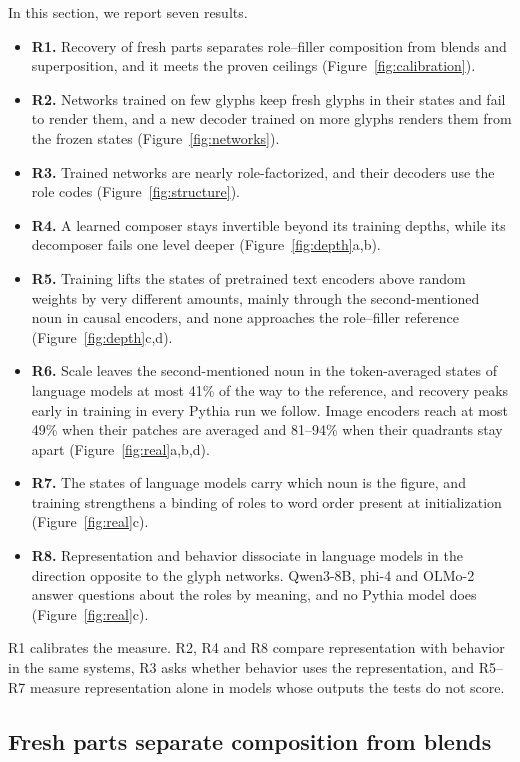 \documentclass[10pt]{article}
\theoremstyle{plain}
\theoremstyle{remark}
\begin{document}
In this section, we report seven results.
\begin{itemize}
  \item \textbf{R1.} Recovery of fresh parts separates role--filler composition from blends and superposition, and it meets the proven ceilings (Figure~\ref{fig:calibration}).
  \item \textbf{R2.} Networks trained on few glyphs keep fresh glyphs in their states and fail to render them, and a new decoder trained on more glyphs renders them from the frozen states (Figure~\ref{fig:networks}).
  \item \textbf{R3.} Trained networks are nearly role-factorized, and their decoders use the role codes (Figure~\ref{fig:structure}).
  \item \textbf{R4.} A learned composer stays invertible beyond its training depths, while its decomposer fails one level deeper (Figure~\ref{fig:depth}a,b).
  \item \textbf{R5.} Training lifts the states of pretrained text encoders above random weights by very different amounts, mainly through the second-mentioned noun in causal encoders, and none approaches the role--filler reference (Figure~\ref{fig:depth}c,d).
  \item \textbf{R6.} Scale leaves the second-mentioned noun in the token-averaged states of language models at most 41\% of the way to the reference, and recovery peaks early in training in every Pythia run we follow. Image encoders reach at most 49\% when their patches are averaged and 81--94\% when their quadrants stay apart (Figure~\ref{fig:real}a,b,d).
  \item \textbf{R7.} The states of language models carry which noun is the figure, and training strengthens a binding of roles to word order present at initialization (Figure~\ref{fig:real}c).
  \item \textbf{R8.} Representation and behavior dissociate in language models in the direction opposite to the glyph networks. Qwen3-8B, phi-4 and OLMo-2 answer questions about the roles by meaning, and no Pythia model does (Figure~\ref{fig:real}c).
\end{itemize}
R1 calibrates the measure. R2, R4 and R8 compare representation with behavior in the same systems, R3 asks whether behavior uses the representation, and R5--R7 measure representation alone in models whose outputs the tests do not score.

\subsection{Fresh parts separate composition from blends}
\label{sec:calibration}
\end{document}
